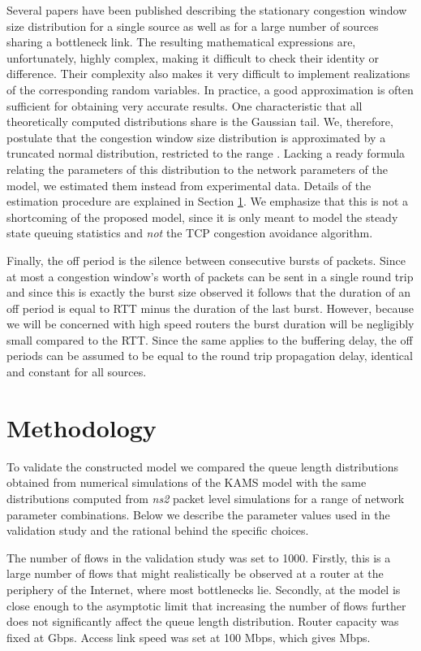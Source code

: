 \documentclass{IEEEtran}[10pt,letterpaper,conference]
\begin{document}
Several papers have been published describing the stationary congestion window size distribution for a single source as well as for a large number of sources sharing a bottleneck link. The resulting mathematical expressions are, unfortunately, highly complex, making it difficult to check their identity or difference. Their complexity also makes it very difficult to implement realizations of the corresponding random variables. In practice, a good approximation is often sufficient for obtaining very accurate results. One characteristic that all theoretically computed distributions share is the Gaussian tail. We, therefore, postulate that the congestion window size distribution is approximated by a truncated normal distribution, restricted to the range . Lacking a ready formula relating the parameters of this distribution to the network parameters of the model, we estimated them instead from experimental data. Details of the estimation procedure are explained in Section \ref{methodology}. We emphasize that this is not a shortcoming of the proposed model, since it is only meant to model the steady state queuing statistics and \emph{not} the TCP congestion avoidance algorithm. 

Finally, the off period is the silence between consecutive bursts of packets. Since at most a congestion window's worth of packets can be sent in a single round trip and since this is exactly the burst size observed it follows that the duration of an off period is equal to RTT minus the duration of the last burst. However, because we will be concerned with high speed routers the burst duration will be negligibly small compared to the RTT. Since the same applies to the buffering delay, the off periods can be assumed to be equal to the round trip propagation delay, identical and constant for all sources.

\section{Methodology}
\label{methodology}
To validate the constructed model we compared the queue length distributions obtained from numerical simulations of the KAMS model with the same distributions computed from \emph{ns2} packet level simulations for a range of network parameter combinations. Below we describe the parameter values used in the validation study and the rational behind the specific choices.

The number of flows  in the validation study was set to 1000. Firstly, this is a large number of flows that might realistically be observed at a router at the periphery of the Internet, where most bottlenecks lie. Secondly, at  the model is close enough to the asymptotic limit that increasing the number of flows further does not significantly affect the queue length distribution. Router capacity was fixed at  Gbps. Access link speed was set at 100 Mbps, which gives  Mbps.
\end{document}
